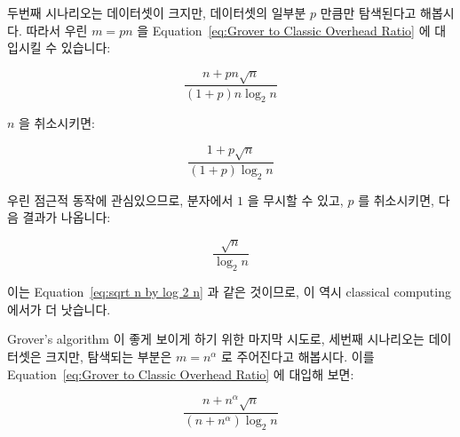두번째 시나리오는 데이터셋이 크지만, 데이터셋의 일부분 $p$ 만큼만 탐색된다고 해봅시다.
따라서 우린 $m = pn$ 을
Equation~\ref{eq:Grover to Classic Overhead Ratio} 에 대입시킬 수 있습니다:

\begin{equation}
	\frac{n + p n \sqrt n}{\left( 1 + p \right) n \log_2 n}
\end{equation}

$n$ 을 취소시키면:

\begin{equation}
	\frac{1 + p \sqrt n}{\left( 1 + p \right) \log_2 n}
\end{equation}

우린 점근적 동작에 관심있으므로, 분자에서 $1$ 을 무시할 수 있고, $p$ 를
취소시키면, 다음 결과가 나옵니다:

\begin{equation}
	\frac{\sqrt n}{\log_2 n}
\end{equation}

이는 Equation~\ref{eq:sqrt n by log 2 n} 과 같은 것이므로, 이 역시 classical
computing 에서가 더 낫습니다.

Grover's algorithm 이 좋게 보이게 하기 위한 마지막 시도로, 세번째 시나리오는
데이터셋은 크지만, 탐색되는 부분은 $m = n^\alpha$ 로 주어진다고 해봅시다.
이를
Equation~\ref{eq:Grover to Classic Overhead Ratio}
에 대입해 보면:

\begin{equation}
	\frac{n + n^\alpha \sqrt n}{\left( n + n^\alpha \right) \log_2 n}
\end{equation}

